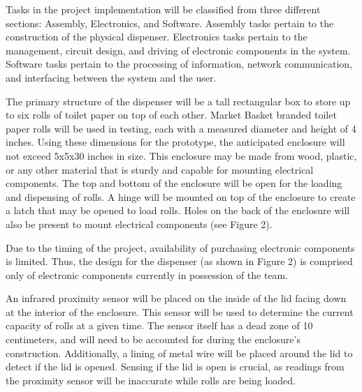 \par Tasks in the project implementation will be classified from three different sections: Assembly, Electronics, and Software. Assembly tasks pertain to the construction of the physical dispenser. Electronics tasks pertain to the management, circuit design, and driving of electronic components in the system. Software tasks pertain to the processing of information, network communication, and interfacing between the system and the user.

\par The primary structure of the dispenser will be a tall rectangular box to store up to six rolls of toilet paper on top of each other. Market Basket branded toilet paper rolls will be used in testing, each with a measured diameter and height of 4 inches. Using these dimensions for the prototype, the anticipated enclosure will not exceed 5x5x30 inches in size. This enclosure may be made from wood, plastic, or any other material that is sturdy and capable for mounting electrical components. The top and bottom of the enclosure will be open for the loading and dispensing of rolls. A hinge will be mounted on top of the enclosure to create a latch that may be opened to load rolls. Holes on the back of the enclosure will also be present to mount electrical components (see Figure 2).

\par Due to the timing of the project, availability of purchasing electronic components is limited. Thus, the design for the dispenser (as shown in Figure 2) is comprised only of electronic components currently in possession of the team.

\par An infrared proximity sensor will be placed on the inside of the lid facing down at the interior of the enclosure. This sensor will be used to determine the current capacity of rolls at a given time. The sensor itself has a dead zone of 10 centimeters, and will need to be accounted for during the enclosure's construction. Additionally, a lining of metal wire will be placed around the lid to detect if the lid is opened. Sensing if the lid is open is crucial, as readings from the proximity sensor will be inaccurate while rolls are being loaded.

